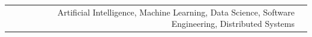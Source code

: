 
\begin{tabular}{rl}
    Artificial Intelligence, Machine Learning, Data Science, Software Engineering, Distributed Systems \\
\end{tabular}
